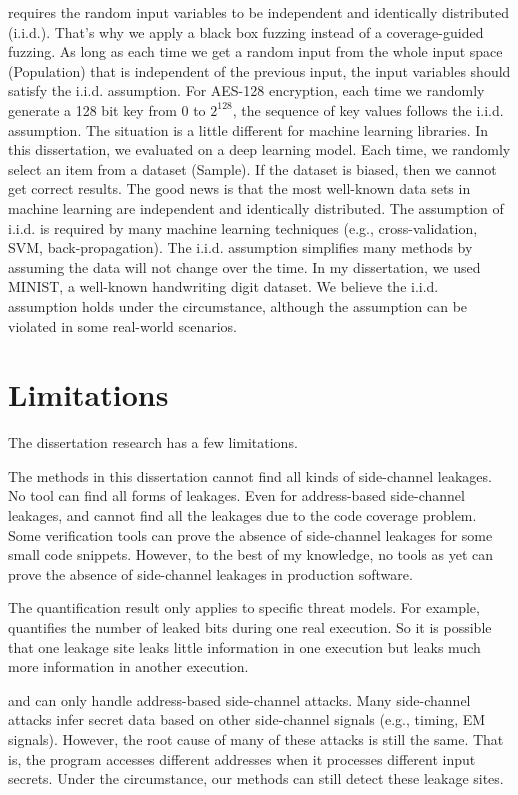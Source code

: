 \ctool{} requires the random input variables to be independent and identically distributed (i.i.d.). That's why we apply a black box fuzzing instead of a coverage-guided fuzzing. As long as each time we get a random input from the whole input space (Population) that is independent of the previous input, the input variables should satisfy the i.i.d. assumption. For AES-128 encryption, each time we randomly generate a 128 bit key from $0$ to $2^{128}$, the sequence of key values follows the i.i.d. assumption. The situation is a little different for machine learning libraries. In this dissertation, we evaluated \ctool{} on a deep learning model. Each time, we randomly select an item from a dataset (Sample). If the dataset is biased, then we cannot get correct results. The good news is that the most well-known data sets in
machine learning are independent and identically distributed. The assumption of i.i.d. is required by many machine learning
techniques (e.g., cross-validation, SVM, back-propagation). The i.i.d. assumption
simplifies many methods by assuming the data will not change over the time. 
In my dissertation, we used MINIST, a well-known handwriting digit dataset. 
We believe the i.i.d. assumption holds under the circumstance, although the
assumption can be violated in some real-world scenarios.


\section{Limitations}
The dissertation research has a few limitations.

The methods in this dissertation cannot find all kinds of side-channel leakages. No tool can find all forms of leakages. Even for address-based side-channel leakages, \tool{} and \ctool{} cannot find all the leakages due to the code coverage problem. Some verification tools can prove the absence of side-channel leakages for some small code snippets. However, to the best of my knowledge, no tools as yet can prove the absence of side-channel leakages in production software.

The quantification result only applies to specific threat models. For example,\tool{} quantifies the number of leaked bits during one real execution. So it is possible that one leakage site leaks little information in one execution but leaks much more information in another execution.
\item \tool{} and \ctool{} can only handle address-based side-channel attacks. Many side-channel attacks infer secret data based on other side-channel signals (e.g., timing, EM signals). However, the root cause of many of these attacks is still the same. That is, the program accesses different addresses when it processes different input secrets. Under the circumstance, our methods can still detect these leakage sites.

